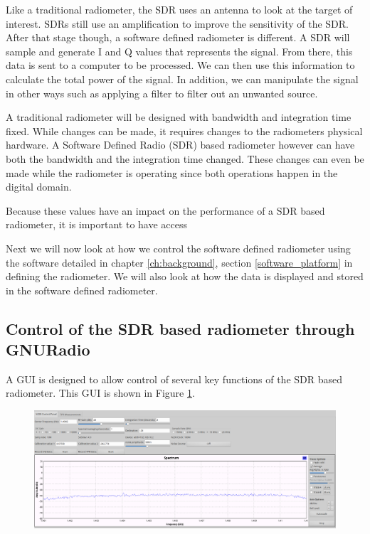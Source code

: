 Like a traditional radiometer, the SDR uses an antenna to look at the target of interest.  SDRs still use an amplification to improve the sensitivity of the SDR. After that stage though, a software defined radiometer is different.  A SDR will sample and generate I and Q values that represents the signal.  From there, this data is sent to a computer to be processed.  We can then use this information to calculate the total power of the signal.  In addition, we can manipulate the signal in other ways such as applying a filter to filter out an unwanted source.

A traditional radiometer will be designed with bandwidth and integration time fixed.  While changes can be made, it requires changes to the radiometers physical hardware.  A Software Defined Radio (SDR) based radiometer however can have both the  bandwidth and the integration time changed.  These changes can even be made while the radiometer is operating since both operations happen in the digital domain.  

Because these values have an impact on the performance of a SDR based radiometer, it is important to have access 

Next we will now look at how we control the software defined radiometer using the software detailed in chapter \ref{ch:background}, section \ref{software_platform} in defining the radiometer.  We will also look at how the data is displayed and stored in the software defined radiometer.

\subsection{Control of the SDR based radiometer through GNURadio}

A GUI is designed to allow control of several key functions of the SDR based radiometer.  This GUI is shown in Figure \ref{radiometer_gui}. 

{\begin{figure}[h!tb] 
\centering
\includegraphics[width=17cm]{Images/radiometer_gui.png}
\label{radiometer_gui}
\end{figure}
}

